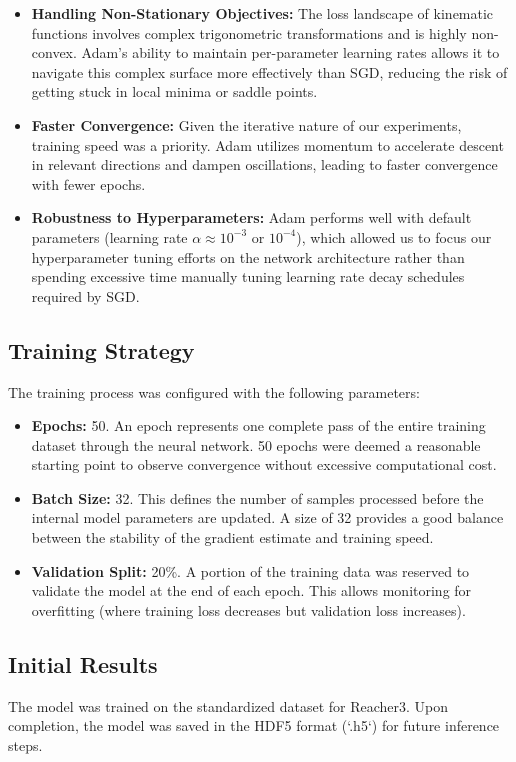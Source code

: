 \documentclass[a4paper,11pt]{article}
\begin{document}
\begin{itemize}
    \item \textbf{Handling Non-Stationary Objectives:} The loss landscape of kinematic functions involves complex trigonometric transformations and is highly non-convex. Adam's ability to maintain per-parameter learning rates allows it to navigate this complex surface more effectively than SGD, reducing the risk of getting stuck in local minima or saddle points.
    \item \textbf{Faster Convergence:} Given the iterative nature of our experiments, training speed was a priority. Adam utilizes momentum  to accelerate descent in relevant directions and dampen oscillations, leading to faster convergence with fewer epochs.
    \item \textbf{Robustness to Hyperparameters:} Adam performs well with default parameters (learning rate $\alpha \approx 10^{-3}$ or $10^{-4}$), which allowed us to focus our hyperparameter tuning efforts on the network architecture rather than spending excessive time manually tuning learning rate decay schedules required by SGD.
\end{itemize}

\subsection{Training Strategy}
The training process was configured with the following parameters:
\begin{itemize}
    \item \textbf{Epochs:} 50. An epoch represents one complete pass of the entire training dataset through the neural network. 50 epochs were deemed a reasonable starting point to observe convergence without excessive computational cost.
    \item \textbf{Batch Size:} 32. This defines the number of samples processed before the internal model parameters are updated. A size of 32 provides a good balance between the stability of the gradient estimate and training speed.
    \item \textbf{Validation Split:} 20\%. A portion of the training data was reserved to validate the model at the end of each epoch. This allows monitoring for overfitting (where training loss decreases but validation loss increases).
\end{itemize}

\subsection{Initial Results}
The model was trained on the standardized dataset for Reacher3. Upon completion, the model was saved in the HDF5 format (`.h5`) for future inference steps.
\end{document}
